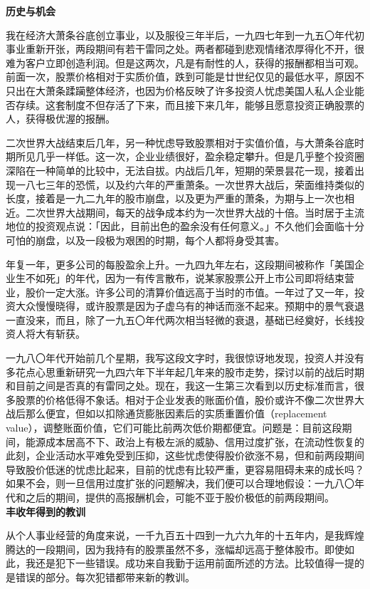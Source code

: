 \documentclass[UTF8,a4paper,zihao=-4,fontset = windows]{ctexart} %
\begin{document}
\textbf{历史与机会}


我在经济大萧条谷底创立事业，以及服役三年半后，一九四七年到一九五〇年代初事业重新开张，两段期间有若干雷同之处。两者都碰到悲观情绪浓厚得化不开，很难为客户立即创造利润。但是这两次，凡是有耐性的人，获得的报酬都相当可观。前面一次，股票价格相对于实质价值，跌到可能是廿世纪仅见的最低水平，原因不只出在大萧条蹂躏整体经济，也因为价格反映了许多投资人忧虑美国人私人企业能否存续。这套制度不但存活了下来，而且接下来几年，能够且愿意投资正确股票的人，获得极优渥的报酬。

二次世界大战结束后几年，另一种忧虑导致股票相对于实值价值，与大萧条谷底时期所见几乎一样低。这一次，企业业绩很好，盈余稳定攀升。但是几乎整个投资圈深陷在一种简单的比较中，无法自拔。内战后几年，短期的荣景昙花一现，接着出现一八七三年的恐慌，以及约六年的严重萧条。一次世界大战后，荣面维持类似的长度，接着是一九二九年的股市崩盘，以及更为严重的萧条，为期与上一次也相近。二次世界大战期间，每天的战争成本约为一次世界大战的十倍。当时居于主流地位的投资观点说：「因此，目前出色的盈余没有任何意义。」不久他们会面临十分可怕的崩盘，以及一段极为艰困的时期，每个人都将身受其害。

年复一年，更多公司的每股盈余上升。一九四九年左右，这段期间被称作「美国企业生不如死」的年代，因为一有传言散布，说某家股票公开上市公司即将结束营业，股价一定大涨。许多公司的清算价值远高于当时的市值。一年过了又一年，投资大众慢慢晓得，或许股票是因为子虚乌有的神话而涨不起来。预期中的景气衰退一直没来，而且，除了一九五〇年代两次相当轻微的衰退，基础已经奠好，长线投资人将大有斩获。

一九八〇年代开始前几个星期，我写这段文字时，我很惊讶地发现，投资人并没有多花点心思重新研究一九四六年下半年起几年来的股市走势，探讨以前的战后时期和目前之间是否真的有雷同之处。现在，我这一生第三次看到以历史标准而言，很多股票的价格低得不象话。相对于企业发表的账面价值，股价或许不像二次世界大战后那么便宜，但如以扣除通货膨胀因素后的实质重置价值（replacement value），调整账面价值，它们可能比前两次低价期都便宜。问题是：目前这段期间，能源成本居高不下、政治上有极左派的威胁、信用过度扩张，在流动性恢复的此刻，企业活动水平难免受到压抑，这些忧虑使得股价欲涨不易，但和前两段期间导致股价低迷的忧虑比起来，目前的忧虑有比较严重，更容易阻碍未来的成长吗？如果不会，则一旦信用过度扩张的问题解决，我们便可以合理地假设：一九八〇年代和之后的期间，提供的高报酬机会，可能不亚于股价极低的前两段期间。
\\

\textbf{丰收年得到的教训}


从个人事业经营的角度来说，一千九百五十四到一九六九年的十五年内，是我辉煌腾达的一段期间，因为我持有的股票虽然不多，涨幅却远高于整体股市。即使如此，我还是犯下一些错误。成功来自我勤于运用前面所述的方法。比较值得一提的是错误的部分。每次犯错都带来新的教训。
\end{document}

